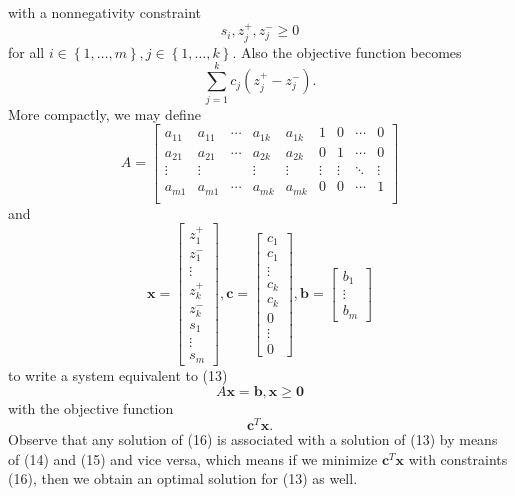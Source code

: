 \documentclass{article}
\renewcommand{\vec}{\mathbf}
\begin{document}
with a nonnegativity constraint
\begin{equation*}
    s_i, z_j^+,z_j^-\geq 0
\end{equation*}
for all $i\in\left\lbrace 1,\ldots,m \right\rbrace,j\in\left\lbrace 1,\ldots,k \right\rbrace $. Also the objective function becomes
\begin{equation*}
    \sum^{k}_{j=1} c_j\left( z_j^+-z_j^- \right) .
\end{equation*}
More compactly, we may define
\begin{equation*}
    A =
    \begin{bmatrix} 
        a_{11} & a_{11} & \cdots & a_{1k} & a_{1k} & 1 & 0 & \cdots & 0 \\
        a_{21} & a_{21} & \cdots & a_{2k} & a_{2k} & 0 & 1 & \cdots & 0 \\
        \vdots & \vdots & & \vdots & \vdots & \vdots & \vdots & \ddots & \vdots \\
        a_{m1} & a_{m1} & \cdots & a_{mk} & a_{mk} & 0 & 0 & \cdots & 1 \\
    \end{bmatrix} 
\end{equation*}
and
\begin{equation*}
    \vec{x} = \begin{bmatrix} z_1^+ \\ z_1^- \\ \vdots \\ z_k^+ \\ z_k^- \\ s_1 \\ \vdots \\ s_m \end{bmatrix} , \vec{c}=\begin{bmatrix} c_1\\c_1\\\vdots\\c_k\\c_k\\0\\\vdots\\0 \end{bmatrix} , \vec{b} = \begin{bmatrix} b_1\\\vdots\\b_m \end{bmatrix} 
\end{equation*}
to write a system equivalent to (13)
\begin{equation}
    A\vec{x}=\vec{b}, \vec{x}\geq \vec{0}
\end{equation}
with the objective function
\begin{equation*}
    \vec{c}^{T} \vec{x}.
\end{equation*}
Observe that any solution of (16) is associated with a solution of (13) by means of (14) and (15) and vice versa, which means if we minimize $\vec{c}^{T} \vec{x}$ with constraints (16), then we obtain an optimal solution for (13) as well.
\end{document}
